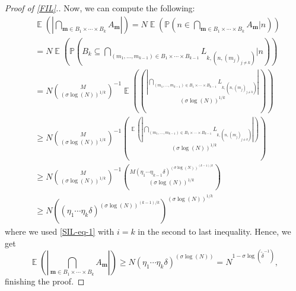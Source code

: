 \documentclass[10pt,a4paper]{amsart}
\newcommand{\E}{\operatorname{\mathbb{E}}}
\renewcommand{\P}{\mathbb{P}}
\begin{document}
\begin{proof}[Proof of \cref{FIL}.]
    Now, we can compute the following:
    \begin{align*}
        &\E\left( \left| \bigcap_{\boldsymbol{m}\in B_1\times \cdots \times B_{k}} A_{\boldsymbol{m}} \right| \right)= N \E\left( \P\left(n\in  \bigcap_{\boldsymbol{m}\in B_1\times \cdots \times B_{k}} A_{\boldsymbol{m}} \Bigg| n\right) \right)\\
        &= N \E\left( \P\left( B_k \subseteq \bigcap_{( m_1,\ldots,m_{k-1})\in  B_1\times \cdots \times B_{k-1} } L_{k,(n,(m_j)_{j\neq k })}  \Bigg| n \right)\right)\\
        &=N \binom{M}{ (\sigma \log(N))^{1/k}}^{-1}  \E\left( \binom{\left|\bigcap_{( m_1,\ldots,m_{k-1})\in  B_1\times \cdots \times B_{k-1} } L_{k,(n,(m_j)_{j\neq k })} \right|}{ (\sigma \log(N))^{1/k}} \right)\\
        &\geq N \binom{M}{ (\sigma \log(N))^{1/k}}^{-1} \binom{  \E\left(\left|\bigcap_{( m_1,\ldots,m_{k-1})\in  B_1\times \cdots \times B_{k-1} } L_{k,(n,(m_j)_{j\neq k })} \right| \right)}{ (\sigma \log(N))^{1/k}} \\
        &\geq N \binom{M}{ (\sigma \log(N))^{1/k}}^{-1} \binom{ M(\eta_1\cdots\eta_{k-1}\delta)^{(\sigma \log(N))^{(k-1)/k}}  }{ (\sigma \log(N))^{1/k}} \\
        &\geq N ((\eta_1\cdots\eta_{k}\delta)^{(\sigma \log(N))^{(k-1)/k}} )^{ (\sigma \log(N))^{1/k}}
    \end{align*}
    where we used \cref{SIL-eq-1} with $i=k$ in the second to last inequality. Hence, we get  
    $$\E\left( \left| \bigcap_{\boldsymbol{m}\in B_1\times \cdots \times B_{k}} A_{\boldsymbol{m}} \right| \right) \geq  N (\eta_1\cdots\eta_{k}\delta)^{(\sigma \log(N)) }  = N^{1-\sigma \log(\tilde{\delta}^{-1})},  $$
    finishing the proof.
\end{proof}
\end{document}
